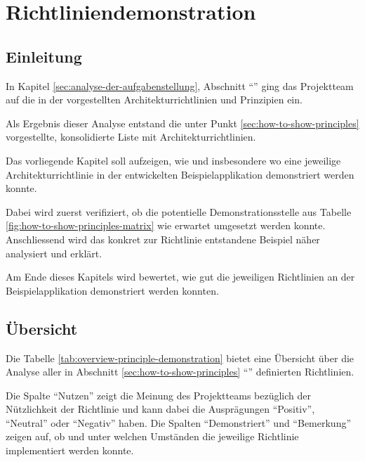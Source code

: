 \chapter{Richtliniendemonstration}
\label{sec:principle-demonstration}

\section*{Einleitung}

In Kapitel \ref{sec:analyse-der-aufgabenstellung}, Abschnitt ``'' ging das Projektteam auf die in der  vorgestellten Architekturrichtlinien und Prinzipien ein.

Als Ergebnis dieser Analyse entstand die unter Punkt \ref{sec:how-to-show-principles} vorgestellte, konsolidierte Liste mit Architekturrichtlinien.

Das vorliegende Kapitel soll aufzeigen, wie und insbesondere wo eine jeweilige Architekturrichtlinie in der entwickelten Beispielapplikation demonstriert werden konnte.

Dabei wird zuerst verifiziert, ob die potentielle Demonstrationsstelle aus Tabelle \ref{fig:how-to-show-principles-matrix} wie erwartet umgesetzt werden konnte.
Anschliessend wird das konkret zur Richtlinie entstandene Beispiel näher analysiert und erklärt.

Am Ende dieses Kapitels wird bewertet, wie gut die jeweiligen Richtlinien an der Beispielapplikation demonstriert werden konnten.

\newpage
\section{Übersicht}

Die Tabelle \ref{tab:overview-principle-demonstration} bietet eine Übersicht über die Analyse aller in Abschnitt \ref{sec:how-to-show-principles} ``'' definierten Richtlinien.


Die Spalte ``Nutzen'' zeigt die Meinung des Projektteams bezüglich der Nützlichkeit der Richtlinie und kann dabei die Ausprägungen ``Positiv'', ``Neutral'' oder ``Negativ'' haben.
Die Spalten ``Demonstriert'' und ``Bemerkung'' zeigen auf, ob und unter welchen Umständen die jeweilige Richtlinie implementiert werden konnte.

